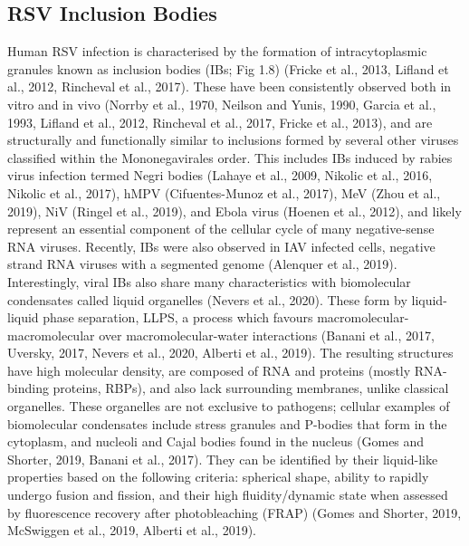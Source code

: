 \subsection{RSV Inclusion Bodies} \label{subsec:RSV Inclusion Bodies}
Human RSV infection is characterised by the formation of intracytoplasmic granules known as inclusion bodies (IBs; Fig 1.8) (Fricke et al., 2013, Lifland et al., 2012, Rincheval et al., 2017). These have been consistently observed both in vitro and in vivo (Norrby et al., 1970, Neilson and Yunis, 1990, Garcia et al., 1993, Lifland et al., 2012, Rincheval et al., 2017, Fricke et al., 2013), and are structurally and functionally similar to inclusions formed by several other viruses classified within the Mononegavirales order. This includes IBs induced by rabies virus infection termed Negri bodies (Lahaye et al., 2009, Nikolic et al., 2016, Nikolic et al., 2017), hMPV (Cifuentes-Munoz et al., 2017), MeV (Zhou et al., 2019), NiV (Ringel et al., 2019), and Ebola virus (Hoenen et al., 2012), and likely represent an essential component of the cellular cycle of many negative-sense RNA viruses. Recently, IBs were also observed in IAV infected cells, negative strand RNA viruses with a segmented genome (Alenquer et al., 2019). Interestingly, viral IBs also share many characteristics with biomolecular condensates called liquid organelles (Nevers et al., 2020). These form by liquid-liquid phase separation, LLPS, a process which favours macromolecular-macromolecular over macromolecular-water interactions (Banani et al., 2017, Uversky, 2017, Nevers et al., 2020, Alberti et al., 2019). The resulting structures have high molecular density, are composed of RNA and proteins (mostly RNA-binding proteins, RBPs), and also lack surrounding membranes, unlike classical organelles. These organelles are not exclusive to pathogens; cellular examples of biomolecular condensates include stress granules and P-bodies that form in the cytoplasm, and nucleoli and Cajal bodies found in the nucleus (Gomes and Shorter, 2019, Banani et al., 2017). They can be identified by their liquid-like properties based on the following criteria: spherical shape, ability to rapidly undergo fusion and fission, and their high fluidity/dynamic state when assessed by fluorescence recovery after photobleaching (FRAP) (Gomes and Shorter, 2019, McSwiggen et al., 2019, Alberti et al., 2019).



